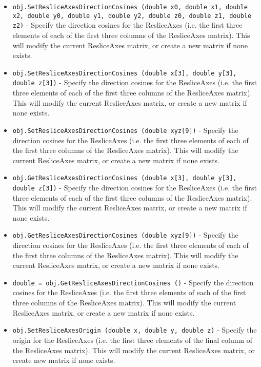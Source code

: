 \begin{itemize}
\item  \verb|obj.SetResliceAxesDirectionCosines (double x0, double x1, double x2, double y0, double y1, double y2, double z0, double z1, double z2)| -  Specify the direction cosines for the ResliceAxes (i.e. the
 first three elements of each of the first three columns of 
 the ResliceAxes matrix).  This will modify the current
 ResliceAxes matrix, or create a new matrix if none exists.

\item  \verb|obj.SetResliceAxesDirectionCosines (double x[3], double y[3], double z[3])| -  Specify the direction cosines for the ResliceAxes (i.e. the
 first three elements of each of the first three columns of 
 the ResliceAxes matrix).  This will modify the current
 ResliceAxes matrix, or create a new matrix if none exists.

\item  \verb|obj.SetResliceAxesDirectionCosines (double xyz[9])| -  Specify the direction cosines for the ResliceAxes (i.e. the
 first three elements of each of the first three columns of 
 the ResliceAxes matrix).  This will modify the current
 ResliceAxes matrix, or create a new matrix if none exists.

\item  \verb|obj.GetResliceAxesDirectionCosines (double x[3], double y[3], double z[3])| -  Specify the direction cosines for the ResliceAxes (i.e. the
 first three elements of each of the first three columns of 
 the ResliceAxes matrix).  This will modify the current
 ResliceAxes matrix, or create a new matrix if none exists.

\item  \verb|obj.GetResliceAxesDirectionCosines (double xyz[9])| -  Specify the direction cosines for the ResliceAxes (i.e. the
 first three elements of each of the first three columns of 
 the ResliceAxes matrix).  This will modify the current
 ResliceAxes matrix, or create a new matrix if none exists.

\item  \verb|double = obj.GetResliceAxesDirectionCosines ()| -  Specify the direction cosines for the ResliceAxes (i.e. the
 first three elements of each of the first three columns of 
 the ResliceAxes matrix).  This will modify the current
 ResliceAxes matrix, or create a new matrix if none exists.

\item  \verb|obj.SetResliceAxesOrigin (double x, double y, double z)| -  Specify the origin for the ResliceAxes (i.e. the first three
 elements of the final column of the ResliceAxes matrix).
 This will modify the current ResliceAxes matrix, or create
 new matrix if none exists.


\end{itemize}
